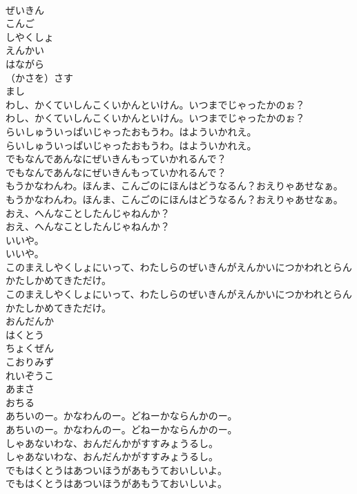 \documentclass[8pt]{extreport}
\begin{document}
\begin{CJK}{UTF8}{min}
\\	ぜいきん
\\	こんご
\\	しやくしょ
\\	えんかい
\\	はながら
\\	（かさを）さす
\\	まし
\\	わし、かくていしんこくいかんといけん。いつまでじゃったかのぉ？	
\\	わし、かくていしんこくいかんといけん。いつまでじゃったかのぉ？ 
\\	らいしゅういっぱいじゃったおもうわ。はよういかれえ。	
\\	らいしゅういっぱいじゃったおもうわ。はよういかれえ。 
\\	でもなんであんなにぜいきんもっていかれるんで？	
\\	でもなんであんなにぜいきんもっていかれるんで？ 
\\	もうかなわんわ。ほんま、こんごのにほんはどうなるん？おえりゃあせなぁ。	
\\	もうかなわんわ。ほんま、こんごのにほんはどうなるん？おえりゃあせなぁ。 
\\	おえ、へんなことしたんじゃねんか？	
\\	おえ、へんなことしたんじゃねんか？ 
\\	いいや。	
\\	いいや。 
\\	このまえしやくしょにいって、わたしらのぜいきんがえんかいにつかわれとらんかたしかめてきただけ。	
\\	このまえしやくしょにいって、わたしらのぜいきんがえんかいにつかわれとらんかたしかめてきただけ。 
\\	おんだんか
\\	はくとう
\\	ちょくぜん
\\	こおりみず
\\	れいぞうこ
\\	あまさ
\\	おちる
\\	あちいのー。かなわんのー。どねーかならんかのー。	
\\	あちいのー。かなわんのー。どねーかならんかのー。 
\\	しゃあないわな、おんだんかがすすみょうるし。	
\\	しゃあないわな、おんだんかがすすみょうるし。 
\\	でもはくとうはあついほうがあもうておいしいよ。	
\\	でもはくとうはあついほうがあもうておいしいよ。 

\end{CJK}
\end{document}
